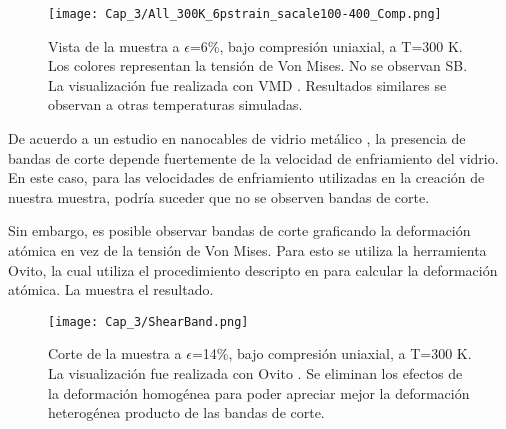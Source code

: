 \begin{figure}[htp]
\centering
\texttt{[image: Cap\_3/All\_300K\_6pstrain\_sacale100-400\_Comp.png]}
\caption[Vista de la muestra a $\epsilon$=6\%, bajo compresión uniaxial, a T=300 K]{Vista de la muestra a $\epsilon$=6\%, bajo compresión uniaxial, a T=300 K. Los colores representan la tensión de Von Mises. No se observan SB. La visualización fue realizada con VMD \citep{humphrey96}. Resultados similares se observan a otras temperaturas simuladas.}
\label{C3:fg:sampleComp}
\end{figure}

De acuerdo a un estudio en nanocables de vidrio metálico \citep{xiao12}, la presencia de bandas de corte depende fuertemente de la velocidad de enfriamiento del vidrio. En este caso, para las velocidades de enfriamiento utilizadas en la creación de nuestra muestra, podría suceder que no se observen bandas de corte. 

Sin embargo, es posible observar bandas de corte graficando la deformación atómica en vez de la tensión de Von Mises. Para esto se utiliza la herramienta Ovito, la cual utiliza el procedimiento descripto en \cite{shimizu07} para calcular la deformación atómica. La  muestra el resultado.






\begin{figure}[htp]
\centering
\texttt{[image: Cap\_3/ShearBand.png]}
\caption[Corte de la muestra a $\epsilon$=14\%, bajo compresión uniaxial, a T=300 K.]{Corte de la muestra a $\epsilon$=14\%, bajo compresión uniaxial, a T=300 K. La visualización fue realizada con Ovito \citep{stukowski10}. Se eliminan los efectos de la deformación homogénea para poder apreciar mejor la deformación heterogénea producto de las bandas de corte.}
\label{C3:fg:SBs}
\end{figure}

